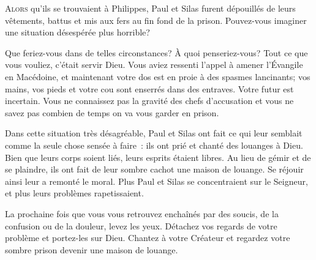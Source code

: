 



\lettrine{A}{lors} qu'ils se trouvaient à Philippes,
 Paul et Silas furent dépouillés de leurs vêtements,
 battus et mis aux fers au fin fond de la prison.
 Pouvez-vous imaginer une situation désespérée plus horrible?

Que feriez-vous dans de telles circonstances? À quoi penseriez-vous?
 Tout ce que vous vouliez, c'était servir Dieu.
 Vous aviez ressenti l'appel à amener l'Évangile en Macédoine,
 et maintenant votre dos est en proie
 à des spasmes lancinants;  vos mains,
 vos pieds et votre cou sont enserrés dans des entraves.
 Votre futur est incertain. Vous ne connaissez pas la gravité
 des chefs d'accusation et vous ne savez pas combien de temps
 on va vous garder en prison.

Dans cette situation très désagréable, Paul et Silas
 ont fait ce qui leur semblait comme la seule chose sensée à faire~:
 ils ont prié et chanté des louanges à Dieu.
 Bien que leurs corps soient liés, leurs esprits étaient libres.
 Au lieu de gémir et de se plaindre, ils ont fait de leur sombre cachot
 une maison de louange. Se réjouir ainsi leur a remonté le moral.
 Plus Paul et Silas se concentraient sur le Seigneur,
 et plus leurs problèmes rapetissaient.


La prochaine fois que vous vous retrouvez enchaînés par des soucis,
 de la confusion ou de la douleur, levez les yeux.
 Détachez vos regards de votre problème et portez-les sur Dieu.
 Chantez à votre Créateur \ocadr et regardez votre sombre prison
 devenir une maison de louange.

\dvrule






